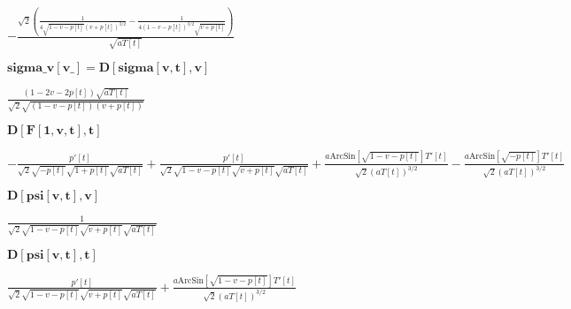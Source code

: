 \documentclass{article}
\begin{document}
\begin{doublespace}
\noindent\(-\frac{\sqrt{2} \left(\frac{1}{4 \sqrt{1-v-p[t]} (v+p[t])^{3/2}}-\frac{1}{4 (1-v-p[t])^{3/2} \sqrt{v+p[t]}}\right)}{\sqrt{a T[t]}}\)
\end{doublespace}

\begin{doublespace}
\noindent\(\pmb{\text{sigma$\_$v}[\text{v$\_$}]= D[\text{sigma}[v,t],v]}\)
\end{doublespace}

\begin{doublespace}
\noindent\(\frac{(1-2 v-2 p[t]) \sqrt{a T[t]}}{\sqrt{2} \sqrt{(1-v-p[t]) (v+p[t])}}\)
\end{doublespace}

\begin{doublespace}
\noindent\(\pmb{D[F[1,v,t],t]}\)
\end{doublespace}

\begin{doublespace}
\noindent\(-\frac{p'[t]}{\sqrt{2} \sqrt{-p[t]} \sqrt{1+p[t]} \sqrt{a T[t]}}+\frac{p'[t]}{\sqrt{2} \sqrt{1-v-p[t]} \sqrt{v+p[t]} \sqrt{a T[t]}}+\frac{a
\text{ArcSin}\left[\sqrt{1-v-p[t]}\right] T'[t]}{\sqrt{2} (a T[t])^{3/2}}-\frac{a \text{ArcSin}\left[\sqrt{-p[t]}\right] T'[t]}{\sqrt{2} (a T[t])^{3/2}}\)
\end{doublespace}

\begin{doublespace}
\noindent\(\pmb{D[\text{psi}[v,t],v]}\)
\end{doublespace}

\begin{doublespace}
\noindent\(\frac{1}{\sqrt{2} \sqrt{1-v-p[t]} \sqrt{v+p[t]} \sqrt{a T[t]}}\)
\end{doublespace}

\begin{doublespace}
\noindent\(\pmb{D[\text{psi}[v,t],t]}\)
\end{doublespace}

\begin{doublespace}
\noindent\(\frac{p'[t]}{\sqrt{2} \sqrt{1-v-p[t]} \sqrt{v+p[t]} \sqrt{a T[t]}}+\frac{a \text{ArcSin}\left[\sqrt{1-v-p[t]}\right] T'[t]}{\sqrt{2} (a
T[t])^{3/2}}\)
\end{doublespace}
\end{document}
